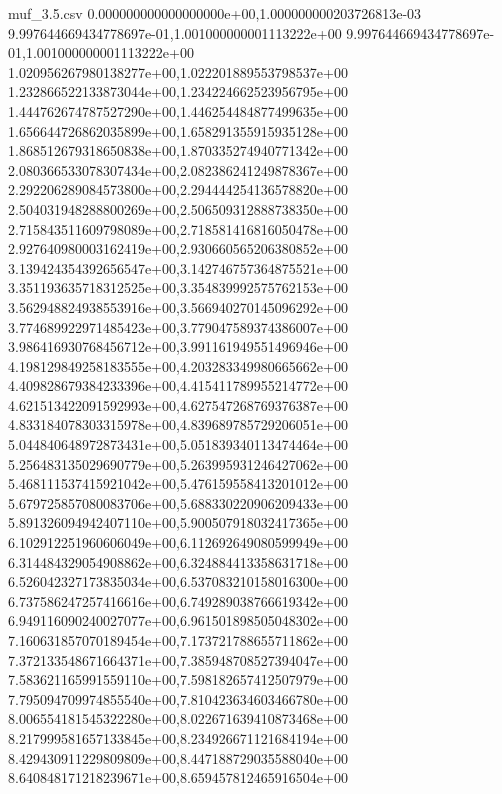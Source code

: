 \begin{filecontents*}{muf_3.5.csv}
0.000000000000000000e+00,1.000000000203726813e-03
9.997644669434778697e-01,1.001000000001113222e+00
9.997644669434778697e-01,1.001000000001113222e+00
1.020956267980138277e+00,1.022201889553798537e+00
1.232866522133873044e+00,1.234224662523956795e+00
1.444762674787527290e+00,1.446254484877499635e+00
1.656644726862035899e+00,1.658291355915935128e+00
1.868512679318650838e+00,1.870335274940771342e+00
2.080366533078307434e+00,2.082386241249878367e+00
2.292206289084573800e+00,2.294444254136578820e+00
2.504031948288800269e+00,2.506509312888738350e+00
2.715843511609798089e+00,2.718581416816050478e+00
2.927640980003162419e+00,2.930660565206380852e+00
3.139424354392656547e+00,3.142746757364875521e+00
3.351193635718312525e+00,3.354839992575762153e+00
3.562948824938553916e+00,3.566940270145096292e+00
3.774689922971485423e+00,3.779047589374386007e+00
3.986416930768456712e+00,3.991161949551496946e+00
4.198129849258183555e+00,4.203283349980665662e+00
4.409828679384233396e+00,4.415411789955214772e+00
4.621513422091592993e+00,4.627547268769376387e+00
4.833184078303315978e+00,4.839689785729206051e+00
5.044840648972873431e+00,5.051839340113474464e+00
5.256483135029690779e+00,5.263995931246427062e+00
5.468111537415921042e+00,5.476159558413201012e+00
5.679725857080083706e+00,5.688330220906209433e+00
5.891326094942407110e+00,5.900507918032417365e+00
6.102912251960606049e+00,6.112692649080599949e+00
6.314484329054908862e+00,6.324884413358631718e+00
6.526042327173835034e+00,6.537083210158016300e+00
6.737586247257416616e+00,6.749289038766619342e+00
6.949116090240027077e+00,6.961501898505048302e+00
7.160631857070189454e+00,7.173721788655711862e+00
7.372133548671664371e+00,7.385948708527394047e+00
7.583621165991559110e+00,7.598182657412507979e+00
7.795094709974855540e+00,7.810423634603466780e+00
8.006554181545322280e+00,8.022671639410873468e+00
8.217999581657133845e+00,8.234926671121684194e+00
8.429430911229809809e+00,8.447188729035588040e+00
8.640848171218239671e+00,8.659457812465916504e+00

\end{filecontents*}

